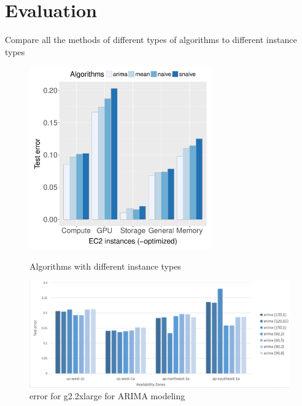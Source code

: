 \documentclass[graybox]{svmult}
\begin{document}
\section{Evaluation}
Compare all the methods of different types of algorithms to different instance types
\begin{figure}
\centering\includegraphics[width=0.7\textwidth]{figures/algorithm-compare-different-instance-type.pdf}\caption{Algorithms with different instance types\label{fig:algo-diff-inst}}
\hfill
\centering\includegraphics[width=1.2\textwidth]{figures/g2-4M-L.png}\caption{ error for g2.2xlarge for ARIMA modeling\label{fig:algo-diff-inst}}


\end{figure}
\end{document}
